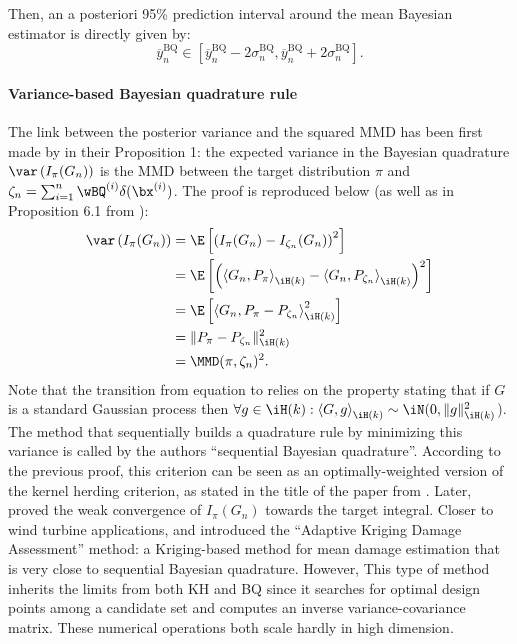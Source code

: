 \noindent Then, an a posteriori 95\% prediction interval around the mean Bayesian estimator is directly given by: 
\begin{equation}
   \overline{y}_n^{\mathrm{BQ}} \in \left[\overline{y}_n^{\mathrm{BQ}} - 2\sigma_n^{\mathrm{BQ}}, \overline{y}_n^{\mathrm{BQ}} + 2\sigma_n^{\mathrm{BQ}} \right].
\end{equation}

\paragraph{Variance-based Bayesian quadrature rule}%
The link between the posterior variance and the squared MMD has been first made by \cite{husar_duvenaud_2012} in their Proposition 1: the expected variance in the Bayesian quadrature $\var\left(I_{\pi}(G_n)\right)$ is the MMD between the target distribution $\pi$ and $\zeta_n = \sum_{i=1}^n \wBQ^{(i)} \delta(\bx^{(i)})$. 
The proof is reproduced below (as well as in Proposition 6.1 from \citealp{motonobu_2018}): 
\begin{subequations}
\begin{align}
    \var\left(I_{\pi}(G_n)\right) &= \E\left[ \left(I_{\pi}(G_n) - I_{\zeta_n}(G_n)\right)^2\right]\\
    &= \E\left[ \left( \left\langle G_n, P_{\pi} \right\rangle_{\iH(k)} - \left\langle G_n, P_{\zeta_n}\right\rangle_{\iH(k)} \right)^2\right]\\ \label{eq:bq_v1}
    &= \E\left[ \left\langle G_n, P_{\pi} - P_{\zeta_n} \right\rangle_{\iH(k)}^2\right]\\ \label{eq:bq_v2}
    &= \lVert P_{\pi} - P_{\zeta_n} \lVert^2_{\iH(k)}\\ 
    &= \MMD(\pi, \zeta_n)^2.
\end{align}
\end{subequations}
Note that the transition from equation  to  relies on the property stating that if $G$ is a standard Gaussian process then $\forall g \in \iH(k) : \left\langle G, g \right\rangle_{\iH(k)} \sim \iN(0, \lVert g \lVert^2_{\iH(k)}$). 
The method that sequentially builds a quadrature rule by minimizing this variance is called by the authors ``sequential Bayesian quadrature''. 
According to the previous proof, this criterion can be seen as an optimally-weighted version of the kernel herding criterion, as stated in the title of the paper from \cite{husar_duvenaud_2012}. 
Later, \cite{briol_2015} proved the weak convergence of $I_{\pi}(G_n)$ towards the target integral. 
Closer to wind turbine applications, \cite{huchet_2019} and \cite{huchet_mattrand_2019} introduced the ``Adaptive Kriging Damage Assessment'' method: a Kriging-based method for mean damage estimation that is very close to sequential Bayesian quadrature. 
However, This type of method inherits the limits from both KH and BQ since it searches for optimal design points among a candidate set and computes an inverse variance-covariance matrix. 
These numerical operations both scale hardly in high dimension. 

